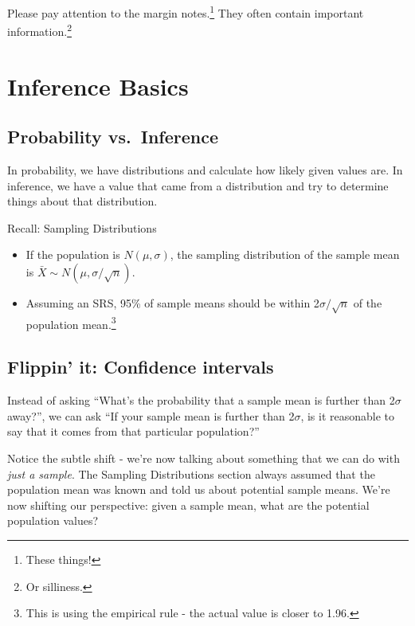 \documentclass[
  letterpaper,
  DIV=11,
  numbers=noendperiod]{scrreprt}
\providecommand{\tightlist}{%
  \setlength{\itemsep}{0pt}\setlength{\parskip}{0pt}}\usepackage{longtable,booktabs,array}
\begin{document}
Please pay attention to the margin notes.\footnote{These things!} They
often contain important information.\footnote{Or silliness.}

\hypertarget{inference-basics}{%
\chapter{Inference Basics}\label{inference-basics}}

\hypertarget{probability-vs.-inference}{%
\section{Probability vs.~Inference}\label{probability-vs.-inference}}

In probability, we have distributions and calculate how likely given
values are. In inference, we have a value that came from a distribution
and try to determine things about that distribution.

Recall: Sampling Distributions

\begin{itemize}
\tightlist
\item
  If the population is \(N(\mu,\sigma)\), the sampling distribution of
  the sample mean is \(\bar X\sim N(\mu,\sigma/\sqrt{n})\).
\item
  Assuming an SRS, 95\% of sample means should be within
  2\(\sigma/\sqrt{n}\) of the population mean.\footnote{This is using
    the empirical rule - the actual value is closer to 1.96.}
\end{itemize}

\hypertarget{flippin-it-confidence-intervals}{%
\section{Flippin' it: Confidence
intervals}\label{flippin-it-confidence-intervals}}

Instead of asking ``What's the probability that a sample mean is further
than 2\(\sigma\) away?'', we can ask ``If your sample mean is further
than 2\(\sigma\), is it reasonable to say that it comes from that
particular population?''

Notice the subtle shift - we're now talking about something that we can
do with \emph{just a sample}. The Sampling Distributions section always
assumed that the population mean was known and told us about potential
sample means. We're now shifting our perspective: given a sample mean,
what are the potential population values?
\end{document}
